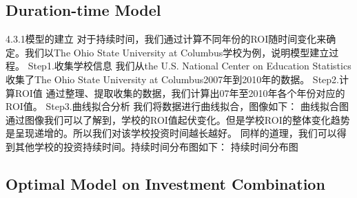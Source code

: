 \subsection{Duration-time Model}

4.3.1模型的建立
对于持续时间，我们通过计算不同年份的ROI随时间变化来确定。我们以The Ohio State University at Columbus学校为例，说明模型建立过程。
Step1.收集学校信息
我们从the U.S. National Center on Education Statistics收集了The Ohio State University at Columbus2007年到2010年的数据。
Step2.计算ROI值
通过整理、提取收集的数据，我们计算出07年至2010年各个年份对应的ROI值。
Step3.曲线拟合分析
我们将数据进行曲线拟合，图像如下：
曲线拟合图
通过图像我们可以了解到，学校的ROI值起伏变化。但是学校ROI的整体变化趋势是呈现递增的。所以我们对该学校投资时间越长越好。
同样的道理，我们可以得到其他学校的投资持续时间。持续时间分布图如下：
持续时间分布图

\subsection{Optimal Model on Investment Combination}

